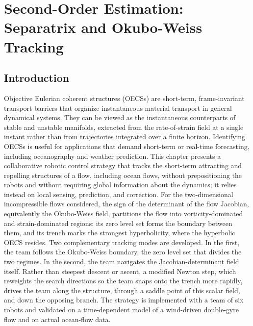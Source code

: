 \documentclass[12pt, letterpaper, oneside]{report}
\begin{document}
\chapter{Second-Order Estimation: Separatrix and Okubo-Weiss Tracking}
\label{ch:separatrix}

\section{Introduction}
\label{sec:sep_intro}

Objective Eulerian coherent structures (OECSs) are short-term,
frame-invariant transport barriers that organize instantaneous material
transport in general dynamical systems. They can be viewed as the
instantaneous counterparts of stable and unstable manifolds, extracted from
the rate-of-strain field at a single instant rather than from trajectories
integrated over a finite horizon. Identifying OECSs is useful for
applications that demand short-term or real-time forecasting, including
oceanography and weather prediction. This chapter presents a collaborative
robotic control strategy that tracks the short-term attracting and
repelling structures of a flow, including ocean flows, without
prepositioning the robots and without requiring global information about
the dynamics; it relies instead on local sensing, prediction, and
correction. For the two-dimensional incompressible flows considered, the
sign of the determinant of the flow Jacobian, equivalently the Okubo-Weiss
field, partitions the flow into vorticity-dominated and strain-dominated
regions: its zero level set forms the boundary between them, and its
trench marks the strongest hyperbolicity, where the hyperbolic OECS
resides. Two complementary tracking modes are developed. In the first, the
team follows the Okubo-Weiss boundary, the zero level set that divides the
two regimes. In the second, the team navigates the Jacobian-determinant
field itself. Rather than steepest descent or ascent, a modified Newton
step, which reweights the search directions so the team snaps onto the
trench more rapidly, drives the team along the structure, through a saddle
point of this scalar field, and down the opposing branch. The strategy is
implemented with a team of six robots and validated on a time-dependent
model of a wind-driven double-gyre flow and on actual ocean-flow data.
\end{document}
